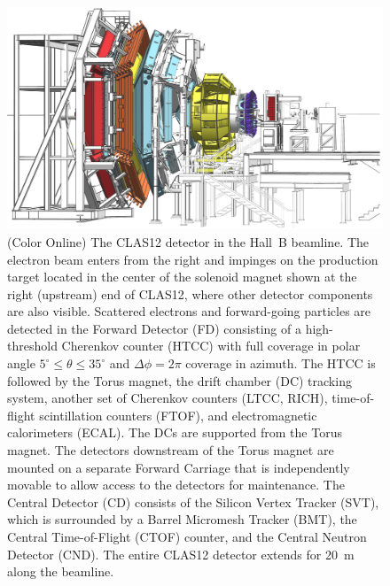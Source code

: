 \documentclass[final,3p,twocolumn]{elsarticle}
\begin{document}
\begin{figure}[t]
\centering
\centerline{\includegraphics[width=1.8\columnwidth]{CLAS12-side-3.png}}
\caption{(Color Online) The CLAS12 detector in the Hall~B beamline. The electron beam enters from the right and impinges on
the production target located in the center of the solenoid magnet shown at the right (upstream) end of CLAS12,
where other detector components are also visible. Scattered electrons and forward-going particles are detected
in the Forward Detector (FD) consisting of a high-threshold Cherenkov counter (HTCC) with full coverage in polar
angle $5^\circ \le \theta \le 35^\circ$ and $\Delta \phi = 2\pi$ coverage in azimuth. The HTCC is followed by the
Torus magnet, the drift chamber (DC) tracking system, another set of Cherenkov counters (LTCC, RICH),
time-of-flight scintillation counters (FTOF), and electromagnetic calorimeters (ECAL). The DCs are supported from
the Torus magnet. The detectors downstream of the Torus magnet are mounted on a separate Forward Carriage that
is independently movable to allow access to the detectors for maintenance. The Central Detector (CD) consists of the
Silicon Vertex Tracker (SVT), which is surrounded by a Barrel Micromesh Tracker (BMT), the Central Time-of-Flight
(CTOF) counter, and the Central Neutron Detector (CND). The entire CLAS12 detector extends for 20~m along the
beamline.} 
\label{clas12}
\end{figure}
\end{document}
